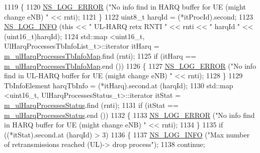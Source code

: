 \begin{DoxyCode}
1119                                 \{
1120                                         \hyperlink{group__logging_ga0261a8db1d4ac5f79417d117634fd455}{NS\_LOG\_ERROR} (\textcolor{stringliteral}{"No info find in HARQ buffer for UE
       (might change eNB) "} << rnti);
1121                                 \}
1122                                 uint8\_t harqId = (*itProcId).second;
1123                                 \hyperlink{group__logging_gafbd73ee2cf9f26b319f49086d8e860fb}{NS\_LOG\_INFO} (\textcolor{keyword}{this} << \textcolor{stringliteral}{" UL-HARQ retx RNTI "} << rnti << \textcolor{stringliteral}{" harqId "}
       << (uint16\_t)harqId);
1124                                 std::map <uint16\_t, UlHarqProcessesTbInfoList\_t>::iterator itHarq = 
      \hyperlink{classns3_1_1MmWaveRrMacScheduler_a3fb20c8b0644fdd05f5545ec0b685b10}{m\_ulHarqProcessesTbInfoMap}.find (rnti);
1125                                 \textcolor{keywordflow}{if} (itHarq == \hyperlink{classns3_1_1MmWaveRrMacScheduler_a3fb20c8b0644fdd05f5545ec0b685b10}{m\_ulHarqProcessesTbInfoMap}.end ())
1126                                 \{
1127                                         \hyperlink{group__logging_ga0261a8db1d4ac5f79417d117634fd455}{NS\_LOG\_ERROR} (\textcolor{stringliteral}{"No info find in UL-HARQ buffer for UE
       (might change eNB) "} << rnti);
1128                                 \}
1129                                 TbInfoElement harqTbInfo = (*itHarq).second.at (harqId);
1130                                 std::map <uint16\_t, UlHarqProcessesStatus\_t>::iterator itStat = 
      \hyperlink{classns3_1_1MmWaveRrMacScheduler_af963cfe7e5dc36fce45c16d60b506465}{m\_ulHarqProcessesStatus}.find (rnti);
1131                                 \textcolor{keywordflow}{if} (itStat == \hyperlink{classns3_1_1MmWaveRrMacScheduler_af963cfe7e5dc36fce45c16d60b506465}{m\_ulHarqProcessesStatus}.end ())
1132                                 \{
1133                                         \hyperlink{group__logging_ga0261a8db1d4ac5f79417d117634fd455}{NS\_LOG\_ERROR} (\textcolor{stringliteral}{"No info find in HARQ buffer for UE
       (might change eNB) "} << rnti);
1134                                 \}
1135                                 \textcolor{keywordflow}{if} ((*itStat).second.at (harqId) > 3)
1136                                 \{
1137                                         \hyperlink{group__logging_gafbd73ee2cf9f26b319f49086d8e860fb}{NS\_LOG\_INFO} (\textcolor{stringliteral}{"Max number of retransmissions reached
       (UL)-> drop process"});
1138                                         \textcolor{keywordflow}{continue};

\end{DoxyCode}
